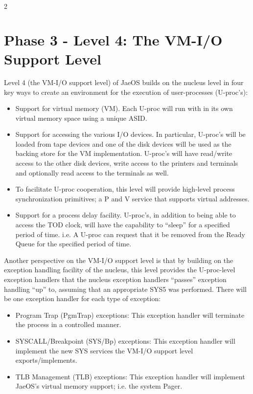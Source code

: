 \setcounter {section} {2}
\section{Phase 3 - Level 4: The VM-I/O Support Level}\label{sec:intro}

Level 4 (the VM-I/O support level) of JaeOS builds on the nucleus level in four key ways to create an environment for the execution of user-processes (U-proc's):
\begin{itemize}
\item Support for virtual memory (VM). Each U-proc will run with\linebreak \vmon{} in its own virtual memory space using a unique ASID.
\item Support for accessing the various I/O devices. In particular, U-proc's will be loaded from tape devices and one of the disk devices will be used as the backing store for the VM implementation. U-proc's will have read/write
access to the other disk devices, write access to the printers and terminals and optionally read access to the terminals as well.
\item To facilitate U-proc cooperation, this level will provide high-level process synchronization primitives; a P and V service that supports virtual addresses.
\item Support for a process delay facility. U-proc's, in addition to being able to access the TOD clock, will have the capability to ``sleep'' for a specified period of time. i.e. A U-proc can request that it be removed from the Ready Queue for the specified period of time.
\end{itemize}

Another perspective on the VM-I/O support level is that by building on the exception handling facility of the nucleus, this level provides the U-proc-level exception handlers that the nucleus exception handlers ``passes'' exception handling ``up'' to, assuming that an appropriate SYS5 was performed. There will be one exception handler for each type of exception:
\begin{itemize}
\item Program Trap (PgmTrap) exceptions: This exception handler will terminate the process in a controlled manner.
\item SYSCALL/Breakpoint (SYS/Bp) exceptions: This exception handler will implement the new SYS services the VM-I/O support level exports/\linebreak implements.
\item TLB Management (TLB) exceptions: This exception handler will implement JaeOS's virtual memory support; i.e. the system Pager.
\end{itemize}

